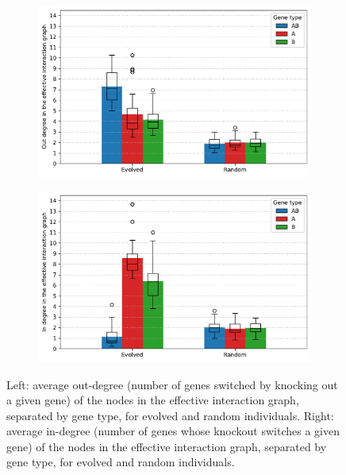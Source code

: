 \begin{figure}[H]
  \begin{subfigure}[t]{0.49\textwidth}
    \includegraphics[width=\textwidth]{ploscb/img/effective_graph_combined_out_degree.pdf}
  \end{subfigure}
  \begin{subfigure}[t]{0.49\textwidth}
    \includegraphics[width=\textwidth]{ploscb/img/effective_graph_combined_in_degree.pdf}
  \end{subfigure}
  \caption[Average in- and out-degree of effective interaction graph nodes for evolved and random individuals]{Left: average out-degree (number of genes switched by knocking out a given gene) of the nodes in the effective interaction graph, separated by gene type, for evolved and random individuals.
  Right: average in-degree (number of genes whose knockout switches a given gene) of the nodes in the effective interaction graph, separated by gene type, for evolved and random individuals.}
  \label{fig:ploscb:ko_data}
\end{figure}


